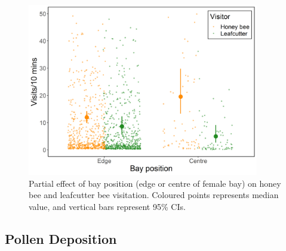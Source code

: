 \documentclass[12pt, draft]{article} %
\begin{document}
\begin{figure}
    \centering
    \includegraphics[width=0.9\textwidth,keepaspectratio=true]{slopeEdgeCent_both.png}
    \caption[Partial effect of bay position on honey bee and leafcutter bee visitation]{Partial effect of bay position (edge or centre of female bay) on honey bee and leafcutter bee visitation. Coloured points represents median value, and vertical bars represent 95\% CIs.}
    \label{fig:edgeCentVis_both}
\end{figure}

\subsection{Pollen Deposition}
\end{document}
